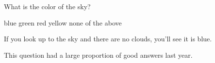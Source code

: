 \documentclass[a4paper]{article}
\begin{document}
\begin{mcquestions}

\question What is the color of the sky?
         
          \begin{mcanswerslist}[fixlast]
          \answer[correct] blue
          \answer green
          \answer red
          \answer yellow
          \answer none of the above
          \end{mcanswerslist}        
          
          \begin{mcexplanation}
          If you look up to the sky and there are no clouds, you'll see it is blue.
          \end{mcexplanation}
                   
          \begin{mcnotes}
          This question had a large proportion of good answers last year.
          \end{mcnotes}
 
 \end{mcquestions}
 
\end{document}
